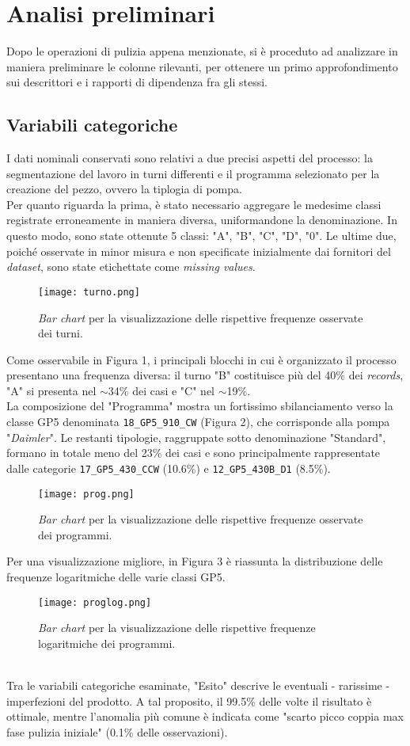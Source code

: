 \documentclass[fleqn,10pt]{SelfArx} %
\begin{document}
\section{Analisi preliminari}
Dopo le operazioni di pulizia appena menzionate, si è proceduto ad analizzare in maniera preliminare le colonne rilevanti, per ottenere un primo approfondimento sui descrittori e i rapporti di dipendenza fra gli stessi. 
\subsection{Variabili categoriche}
I dati nominali conservati sono relativi a due precisi aspetti del processo: la segmentazione del lavoro in turni differenti e il programma selezionato per la creazione del pezzo, ovvero la tiplogia di pompa.\\
Per quanto riguarda la prima, è stato necessario aggregare le medesime classi registrate erroneamente in maniera diversa, uniformandone la denominazione. In questo modo, sono state ottenute 5 classi: "A", "B", "C", "D", "0". Le ultime due, poiché osservate in minor misura e non specificate inizialmente dai fornitori del \textit{dataset}, sono state etichettate come \textit{missing values}.
\begin{figure}[h]
    \centering
    \texttt{[image: turno.png]}
    \label{fig:em}
    \caption{\textit{Bar chart} per la visualizzazione delle rispettive frequenze osservate dei turni.}
\end{figure}
Come osservabile in Figura 1, i principali blocchi in cui è organizzato il processo presentano una frequenza diversa: il turno "B" costituisce più del 40\% dei \textit{records}, "A" si presenta nel $\sim$34\% dei casi e "C" nel $\sim$19\%.\\
La composizione del "Programma" mostra un fortissimo sbilanciamento verso la classe GP5 denominata \texttt{18\_GP5\_910\_CW} (Figura 2), che corrisponde alla pompa "\textit{Daimler}". Le restanti tipologie, raggruppate sotto denominazione "Standard", formano in totale meno del 23\% dei casi e sono principalmente rappresentate dalle categorie \texttt{17\_GP5\_430\_CCW} (10.6\%) e \texttt{12\_GP5\_430B\_D1} (8.5\%).
\begin{figure}[h]
    \centering
    \texttt{[image: prog.png]}
    \label{fig:em}
    \caption{\textit{Bar chart} per la visualizzazione delle rispettive frequenze osservate dei programmi.}
\end{figure}
Per una visualizzazione migliore, in Figura 3 è riassunta la distribuzione delle frequenze logaritmiche delle varie classi GP5.
\begin{figure}[h]
    \centering
    \texttt{[image: proglog.png]}
    \label{fig:em}
    \caption{\textit{Bar chart} per la visualizzazione delle rispettive frequenze logaritmiche dei programmi.}
\end{figure}
\\
Tra le variabili categoriche esaminate, "Esito" descrive le eventuali - rarissime - imperfezioni del prodotto. A tal proposito, il 99.5\% delle volte il risultato è ottimale, mentre l'anomalia più comune è indicata come "scarto picco coppia max fase pulizia iniziale" (0.1\% delle osservazioni).
\end{document}
